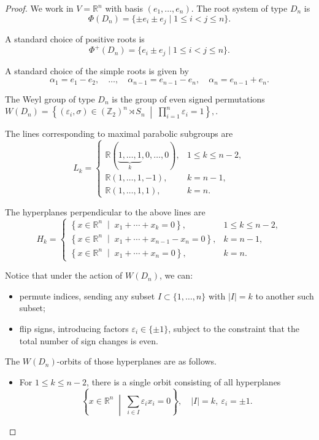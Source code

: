 \documentclass[11pt]{amsart}
\theoremstyle{plain}
\theoremstyle{definition}
\theoremstyle{remark}
\begin{document}
	\begin{proof}
		We work in $V = \mathbb{R}^n$ with basis $(e_1,\dots,e_n)$. The root system of type $D_n$ is
		\[
		\Phi(D_n)
		=
		\{ \pm e_i \pm e_j \mid 1 \le i < j \le n \}.
		\]
		
		A standard choice of positive roots is
		\[
		\Phi^+(D_n)
		=
		\{ e_i \pm e_j \mid 1 \le i < j \le n \}.
		\]
		
		A standard choice of the simple roots is given by
		\[
		\alpha_1 = e_1 - e_2,\quad \dots,\quad
		\alpha_{n-1} = e_{n-1} - e_n,\quad
		\alpha_n = e_{n-1} + e_n.
		\]
		
		The Weyl group of type $D_n$ is the group of even signed permutations $ W(D_n) =
		\left\{
		(\varepsilon_i,\sigma) \in (\mathbb{Z}_2)^n \rtimes S_n
		\;\middle|\;
		\prod_{i=1}^n \varepsilon_i = 1
		\right\},
		$.  
		
		The lines corresponding to maximal parabolic subgroups are
		\[
		L_k =
		\begin{cases}
			\mathbb{R}(\underbrace{1,\dots,1}_{k},0,\dots,0),
			& 1 \le k \le n-2, \\[6pt]
			\mathbb{R}(1,\dots,1,-1),
			& k = n-1, \\[6pt]
			\mathbb{R}(1,\dots,1,1),
			& k = n.
		\end{cases}
		\]
		
		The hyperplanes perpendicular to the above lines are
		\[
		H_k =
		\begin{cases}
			\left\{ x \in \mathbb{R}^n \;\middle|\; x_1 + \cdots + x_k = 0 \right\},
			& 1 \le k \le n-2, \\[6pt]
			\left\{ x \in \mathbb{R}^n \;\middle|\; x_1 + \cdots + x_{n-1} - x_n = 0 \right\},
			& k = n-1, \\[6pt]
			\left\{ x \in \mathbb{R}^n \;\middle|\; x_1 + \cdots + x_n = 0 \right\},
			& k = n.
		\end{cases}
		\]
		
		Notice that under the action of $W(D_n)$, we can:
		\begin{itemize}
			\item permute indices, sending any subset $I \subset \{1,\dots,n\}$ with $|I|=k$ to another such subset;
			\item flip signs, introducing factors $\varepsilon_i \in \{\pm1\}$, subject to the constraint that the total number of sign changes is even.
		\end{itemize}
		
		The $W(D_n)$-orbits of those hyperplanes are as follows.
		\begin{itemize}
			\item For $1 \le k \le n-2$, there is a single orbit consisting of all hyperplanes
			\[
			\left\{
			x \in \mathbb{R}^n \;\middle|\;
			\sum_{i \in I} \varepsilon_i x_i = 0
			\right\},
			\quad |I| = k,\ \varepsilon_i = \pm1.
			\]
			

\end{itemize}
\end{proof}
\end{document}
